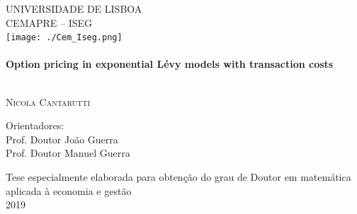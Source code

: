 \begin{titlepage}
\begin{center}



\textsc{\Large UNIVERSIDADE DE LISBOA}\\[0.5cm]
\textsc{\Large CEMAPRE -- ISEG}\\[1cm]

\texttt{[image: ./Cem\_Iseg.png]}~\\[1cm]

\HRule \\[0.4cm]
{ \huge \bfseries Option pricing in exponential Lévy models with transaction costs \\[0.4cm] }

\HRule \\[1.5cm]


\textsc{\LARGE Nicola Cantarutti}\\[1.5cm]


\noindent
\begin{flushleft} \large
Orientadores:\\
Prof. Doutor João Guerra\\
Prof. Doutor Manuel Guerra\\
\end{flushleft}


\vfill

{Tese especialmente elaborada para obtenção do grau de Doutor em matemática aplicada à economia e gestão}\\[2cm]

{\large 2019}\\[0.3cm]

\end{center}
\end{titlepage}